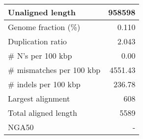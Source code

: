 \documentclass[12pt,a4paper]{article}
\begin{document}
\begin{table}[ht]
\begin{center}
\begin{tabular}{|l*{1}{|r}|}
Unaligned length & 958598 \\ \hline
Genome fraction (\%) & 0.110 \\ \hline
Duplication ratio & 2.043 \\ \hline
\# N's per 100 kbp & 0.00 \\ \hline
\# mismatches per 100 kbp & 4551.43 \\ \hline
\# indels per 100 kbp & 236.78 \\ \hline
Largest alignment & 608 \\ \hline
Total aligned length & 5589 \\ \hline
NGA50 & - \\ \hline
\end{tabular}
\end{center}
\end{table}
\end{document}
